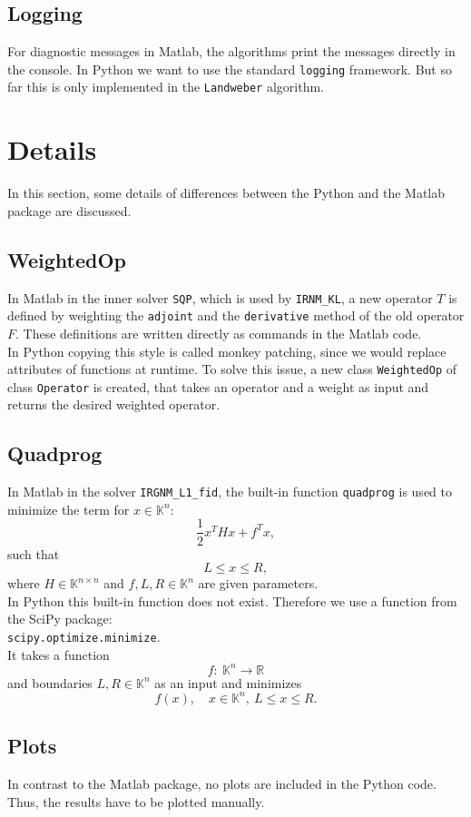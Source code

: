 \documentclass[12pt]{scrartcl}
\begin{document}
\subsection{Logging}
For diagnostic messages in Matlab, the algorithms print the messages directly in the console. In Python we want to use the standard \texttt{logging} framework. But so far this is only implemented in the \texttt{Landweber} algorithm.
\section{Details}
In this section, some details of differences between the Python and the Matlab package are discussed.
\subsection{WeightedOp}
In Matlab in the inner solver \texttt{SQP}, which is used by \verb|IRNM_KL|, a new operator $T$ is defined by weighting the \texttt{adjoint} and the \texttt{derivative} method of the old operator $F$. These definitions are written directly as commands in the Matlab code.\\
In Python copying this style is called monkey patching, since we would replace attributes of functions at runtime. To solve this issue, a new class \texttt{WeightedOp} of class \texttt{Operator} is created, that takes an operator and a weight as input and returns the desired weighted operator.
\subsection{Quadprog}
In Matlab in the solver \verb|IRGNM_L1_fid|, the built-in function \texttt{quadprog} is used to minimize the term for $x\in\mathbb{K}^n$:
$$\frac{1}{2}x^THx+f^Tx,$$
such that
$$L\leq x\leq R,$$
where $H\in\mathbb{K}^{n\times n}$ and $f,L,R\in\mathbb{K}^n$ are given parameters.\\
In Python this built-in function does not exist. Therefore we use a function from the SciPy package:\\
\texttt{scipy.optimize.minimize}.\\
It takes a function 
$$f:~\mathbb{K}^n\rightarrow\mathbb{R}$$
and boundaries $L,R\in\mathbb{K}^n$ as an input and minimizes
$$f(x),\quad x\in\mathbb{K}^n,~L\leq x\leq R.$$
\subsection{Plots}
In contrast to the Matlab package, no plots are included in the Python code. Thus, the results have to be plotted manually.
\end{document}

